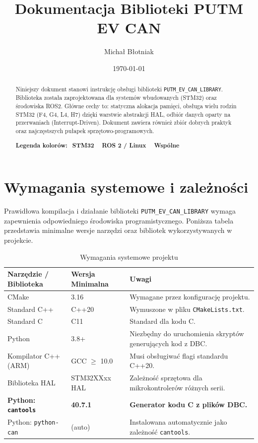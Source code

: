 \documentclass[a4paper,11pt]{article}
\title{\textbf{Dokumentacja Biblioteki PUTM EV CAN}}
\author{Michał Błotniak}
\date{\today}
\begin{document}
\maketitle

\begin{abstract}
Niniejszy dokument stanowi instrukcję obsługi biblioteki \texttt{PUTM\_EV\_CAN\_LIBRARY}. Biblioteka została zaprojektowana dla systemów wbudowanych (STM32) oraz środowiska ROS2. Główne cechy to: statyczna alokacja pamięci, obsługa wielu rodzin STM32 (F4, G4, L4, H7) dzięki warstwie abstrakcji HAL, odbiór danych oparty na przerwaniach (Interrupt-Driven). Dokument zawiera również zbiór dobrych praktyk oraz najczęstszych pułapek sprzętowo-programowych.

\medskip
\noindent\textbf{Legenda kolorów:}~
\colorbox{stm32bglight}{\textcolor{stm32blue}{\textbf{STM32}}}~~
\colorbox{ros2bglight}{\textcolor{ros2green}{\textbf{ROS 2 / Linux}}}~~
\colorbox{commonbg}{\textcolor{commonframe}{\textbf{Wspólne}}}
\end{abstract}

\tableofcontents
\newpage

\section{Wymagania systemowe i zależności}

Prawidłowa kompilacja i działanie biblioteki \texttt{PUTM\_EV\_CAN\_LIBRARY} wymaga zapewnienia odpowiedniego środowiska programistycznego. Poniższa tabela przedstawia minimalne wersje narzędzi oraz bibliotek wykorzystywanych w projekcie.

\begin{table}[h!]
\centering
\begin{tabular}{|l|l|p{6cm}|}
\hline
\textbf{Narzędzie / Biblioteka} & \textbf{Wersja Minimalna} & \textbf{Uwagi} \\ \hline
CMake & 3.16 & Wymagane przez konfigurację projektu. \\ \hline
Standard C++ & C++20 & Wymuszone w pliku \texttt{CMakeLists.txt}. \\ \hline
Standard C & C11 & Standard dla kodu C. \\ \hline
Python & 3.8+ & Niezbędny do uruchomienia skryptów generujących kod z DBC. \\ \hline
Kompilator C++ (ARM) & GCC $\ge$ 10.0 & Musi obsługiwać flagi standardu C++20. \\ \hline
Biblioteka HAL & STM32XXxx HAL & Zależność sprzętowa dla mikrokontrolerów różnych serii. \\ \hline
\textbf{Python: \texttt{cantools}} & \textbf{40.7.1} & \textbf{Generator kodu C z plików DBC.} \\ \hline
Python: \texttt{python-can} & (auto) & Instalowana automatycznie jako zależność \texttt{cantools}. \\ \hline
\end{tabular}
\caption{Wymagania systemowe projektu}
\label{tab:wymagania}
\end{table}
\end{document}
